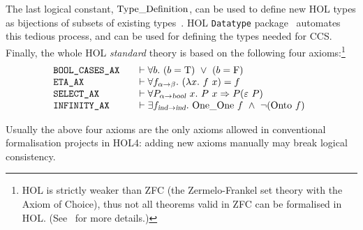 The last logical constant,
$\mathrm{Type\_Definition}$, can be used to define new HOL types as bijections of
subsets of existing types~\cite{Melham:1989dk}.
HOL \texttt{Datatype} package~\cite{Melham:1991, holdesc} automates
this tedious process, and can be used for defining the 
types needed for CCS.
%
Finally, the whole HOL \emph{standard} theory is based on the
following four axioms:\footnote{HOL is strictly
  weaker than ZFC (the Zermelo-Frankel set theory with the
Axiom of Choice), thus not all theorems valid in ZFC can be formalised
in HOL. (See~\cite{hollogic} for more details.)}
\begin{equation*}
\begin{array}{@{}l@{\qquad}l}
\mbox{\texttt{BOOL\_CASES\_AX}} &\vdash \uquant{b} (b = \T )\ \vee \ (b = \F )\\
\mbox{\texttt{ETA\_AX}} &
\vdash \uquant{f_{\alpha\fun\beta}}(\lquant{x}f\ x) = f\\
\mbox{\texttt{SELECT\_AX}} &
\vdash \uquant{P_{\alpha\fun\ty{bool}}\ x} P\ x \imp P({\hilbert}\ P)\\
\mbox{\texttt{INFINITY\_AX}}&
\vdash \equant{f_{\ind\fun \ind}} \OneOne \ f \conj \neg(\Onto \ f)\\
\end{array}
\end{equation*}

Usually the above four axioms are the only axioms allowed
in conventional formalisation projects in HOL4: adding new axioms
manually may break logical consistency.

